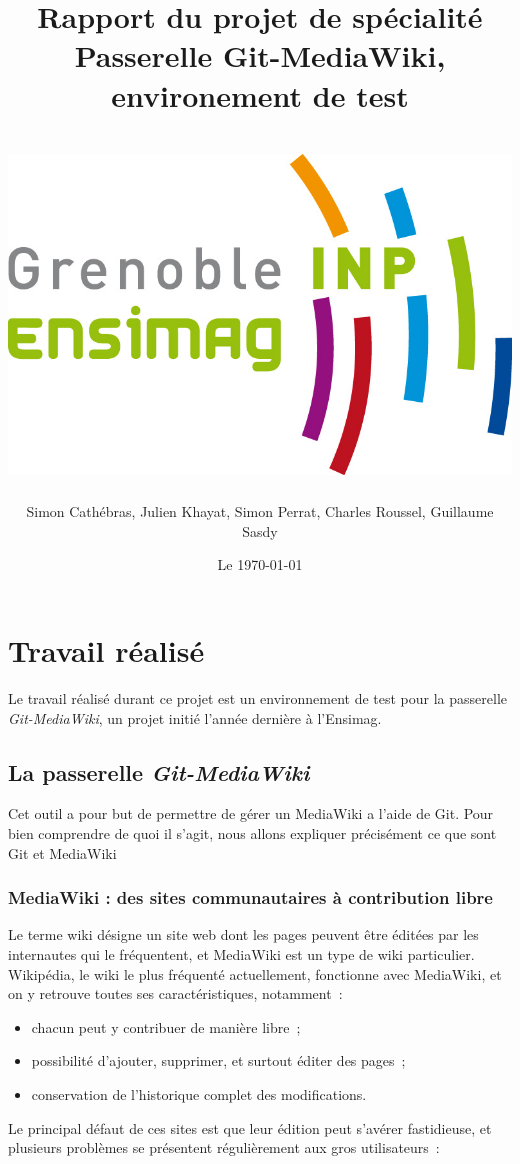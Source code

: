 \documentclass[11pt]{article}
\title{Rapport du projet de spécialité\\
  Passerelle Git-MediaWiki, environement de test\\
  ~\\
  \includegraphics[scale=0.75]{logo_ensimag.jpg} 
}
\author{Simon Cathébras, Julien Khayat, Simon Perrat, Charles Roussel,
  Guillaume Sasdy}
\date{Le \today}
\begin{document}
\maketitle

\section{Travail réalisé}

Le travail réalisé durant ce projet est un environnement de test pour
la passerelle \textit{Git-MediaWiki}, un projet initié l'année
dernière à l'Ensimag.

\subsection{La passerelle  \textit{Git-MediaWiki}}

Cet outil a pour but de permettre de gérer un MediaWiki a l'aide de
Git. Pour bien comprendre de quoi il s'agit, nous allons expliquer
précisément ce que sont Git et MediaWiki

\subsubsection{MediaWiki : des sites communautaires à contribution libre}

Le terme wiki désigne un site web dont les pages peuvent être éditées
par les internautes qui le fréquentent, et MediaWiki est un type de
wiki particulier. Wikipédia, le wiki le plus fréquenté actuellement,
fonctionne avec MediaWiki, et on y retrouve toutes ses
caractéristiques, notamment~:


\begin{itemize}
\item chacun peut y contribuer de manière libre~;
\item possibilité d'ajouter, supprimer, et surtout éditer des pages~;
\item conservation de l'historique complet des modifications.
\end{itemize}

Le principal défaut de ces sites est que leur édition peut s'avérer
fastidieuse, et plusieurs problèmes se présentent régulièrement aux
gros utilisateurs~:
\end{document}
